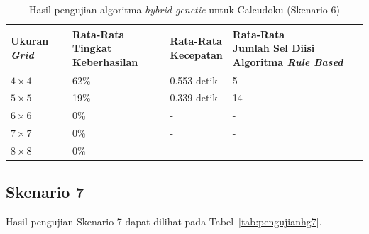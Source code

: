 \begin{table}
\centering
\captionsetup{justification=centering}
\caption[Hasil pengujian algoritma \textit{hybrid genetic} untuk Calcudoku (Skenario 6)]{Hasil pengujian algoritma \textit{hybrid genetic} untuk Calcudoku (Skenario 6)}
\begin{tabular}{| l | l | l | l |}
\hline
Ukuran \textit{Grid} & \makecell[l]{Rata-Rata \\ Tingkat Keberhasilan} & \makecell[l]{Rata-Rata \\ Kecepatan} & \makecell[l]{Rata-Rata \\ Jumlah Sel Diisi Algoritma \textit{Rule Based}} \\
\hline \hline
\begin{math}4 \times 4\end{math} & 62\% & 0.553 detik & 5 \\
\hline
\begin{math}5 \times 5\end{math} & 19\% & 0.339 detik & 14 \\
\hline
\begin{math}6 \times 6\end{math} & 0\% & - & - \\
\hline
\begin{math}7 \times 7\end{math} & 0\% & - & - \\
\hline
\begin{math}8 \times 8\end{math} & 0\% & - & - \\
\hline
\end{tabular}
\label{tab:pengujianhg6}
\end{table}

\subsection{Skenario 7}
\label{sec:skenario7}

Hasil pengujian Skenario 7 dapat dilihat pada Tabel~\ref{tab:pengujianhg7}.

